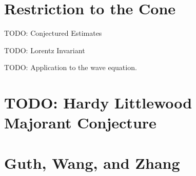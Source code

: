 \begin{comment}
for all $f \in C_c^\infty(\RR^d)$. For large $R > 0$, let $T_R(x,x_d) = (Rx,R^2x_d + R^4)$, and let $S_R = T_R(S^{d-1})$. Then
%
\[ S_R = \left\{ (x,x_d): |x_d - R^4|^2 = R^4 \left(1 - |x|^2/R^2 \right) \right\}. \]
%
For $f \in L^{q'}(S_R)$, $T_R^*f \in L^{q'}(S^{d-1})$, and
%
\[ \| T_R^* f \|_{L^{q'}(S^{d-1})} = R^{-d/q'} \| f \|_{L^{q'}(S_R)}. \]
%
If we let $E_R f = \widehat{f \cdot \sigma_R}$ be the extension operator associated with $S_R$, where $\sigma_R$ is the surface measure in $S_R$, and let $Ef = \widehat{f \cdot \sigma}$ be the extension operator associated with $S^{d-1}$, where $\sigma$ is the surface area on the unit sphere. Then $(T_R)_* \sigma = R^{-d} \sigma_R$, and so for any given $f \in C_c^\infty(\RR^d)$, we calculate simply that
%
\[ E(T_R^* f)(x,x_d) = R^{-d} e^{2 \pi i x_d} E_R f(x/R,x_d/R^2). \]
%
Thus
%
\[ \| E(T_R^* f) \|_{L^{p'}(\RR^d)} = R^{(d+1)/p'-d} \| E_R f \|_{L^{p'}(\RR^d)} \]
%
Thus we conclude that
%
\[ \| E_R f \|_{L^{p'}(\RR^d)} \lesssim R^{d-(d+1)/p'} \|T_R^* f \|_{L^{q'}(S^{d-1})} = R^{d(1-1/q')-(d+1)/p'} \| f \|_{L^{q'}(S_R)}. \]
%
TODO: Show that restriction for the sphere implies restriction for the paraboloid, and vice versa.
\end{comment}

\section{Restriction to the Cone}

TODO: Conjectured Estimates

TODO: Lorentz Invariant

TODO: Application to the wave equation.

\section{TODO: Hardy Littlewood Majorant Conjecture}


\section{Guth, Wang, and Zhang}

